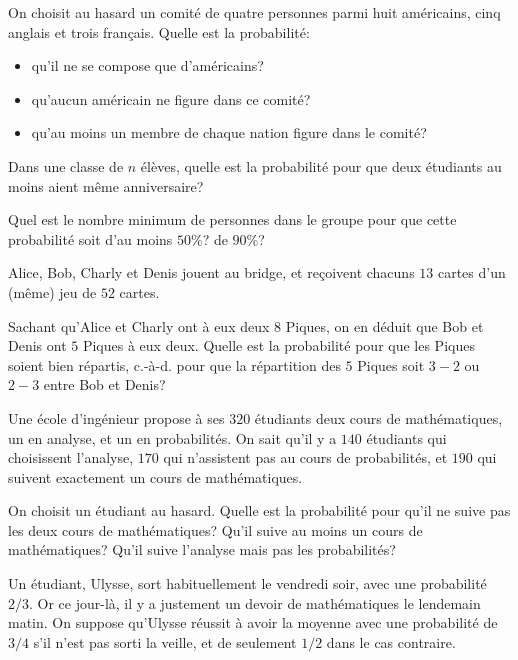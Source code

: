 \documentclass{yann}
\begin{document}
\Exercice

On choisit au hasard un comité de quatre personnes parmi huit américains, cinq anglais et trois français. Quelle est la probabilité:
\begin{itemize}
\item
qu'il ne se compose que d'américains?
\item
qu'aucun américain ne figure dans ce comité?
\item
qu'au moins un membre de chaque nation figure dans le comité?
\end{itemize}


Dans une classe de $n$ élèves, quelle est la probabilité pour que
deux étudiants au moins aient même anniversaire?

Quel est le nombre minimum de personnes dans le groupe pour que
cette probabilité soit d'au moins $50\%$? de $90\%$?

\Exercice

Alice, Bob, Charly et Denis jouent au bridge, et
reçoivent chacuns $13$ cartes d'un (même) jeu de $52$ cartes.

Sachant qu'Alice et Charly ont à eux deux $8$ Piques,
on en déduit que Bob et Denis ont $5$ Piques à eux deux.
Quelle est la probabilité pour que les Piques soient \og{}bien répartis\fg{},
c.-à-d. pour que la répartition des $5$ Piques soit $3-2$ ou $2-3$ entre Bob et Denis?


Une école d'ingénieur propose à ses $320$ étudiants deux cours
de mathématiques, un en analyse, et un en probabilités.
On sait qu'il y a $140$ étudiants qui choisissent l'analyse,
$170$ qui n'assistent pas au cours de probabilités,
et $190$ qui suivent exactement un cours de mathématiques.

On choisit un étudiant au hasard. Quelle est la probabilité pour
qu'il ne suive pas les deux cours de mathématiques?
Qu'il suive au moins un cours de mathématiques?
Qu'il suive l'analyse mais pas les probabilités?

\Exercice

Un étudiant, Ulysse, sort habituellement le vendredi soir, avec une probabilité $2/3$.
Or ce jour-là, il y a justement un devoir de mathématiques le lendemain matin.
On suppose qu'Ulysse réussit à avoir la moyenne avec une probabilité
de $3/4$ s'il n'est pas sorti la veille, et de seulement $1/2$ dans le cas contraire.
\end{document}
